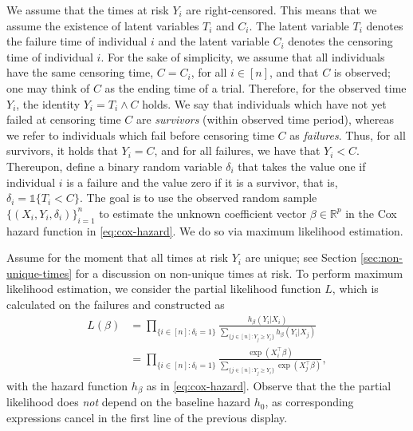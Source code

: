 \documentclass[11pt]{article}
\newcommand{\R}{\mathbb{R}}
\newcommand{\indic}{\mathds{1}}
\begin{document}
We assume that the times at risk $Y_i$ are right-censored. This means that we assume the existence of latent variables $T_i$ and $C_i$. The latent variable $T_i$ denotes the failure time of individual $i$ and the latent variable $C_i$ denotes the censoring time of individual $i$. For the sake of simplicity, we assume that all individuals have the same  censoring time, $C=C_i$, for all $i\in[n]$, and that $C$ is observed; one may think of $C$ as the ending time of a trial. Therefore, for the observed time $Y_i$, the identity $Y_i = T_i \wedge C$ holds. We say that individuals which have not yet failed at censoring time $C$ are  \textit{survivors} (within observed time period), whereas we refer to individuals which fail before censoring time $C$ as \textit{failures}. Thus, for all survivors, it holds that $Y_i = C$, and for all failures, we have that $Y_i < C$. Thereupon, define a binary random variable $\delta_i$ that takes the value one if individual $i$ is a failure and the value zero if it is a survivor, that is, $\delta_i = \indic\{ T_i < C\}$. The goal is to use the observed random sample $\big\{ (X_i, Y_i, \delta_i) \big\}_{i=1}^n$ to estimate the unknown coefficient vector $\beta\in\R^p$ in the Cox hazard function in \eqref{eq:cox-hazard}. We do so via maximum likelihood estimation. 

Assume for the moment that all times at risk $Y_i$ are unique; see Section \ref{sec:non-unique-times} for a discussion on non-unique times at risk. To perform maximum likelihood estimation, we consider the partial likelihood function $L$, which is calculated on the failures and constructed as
\begin{equation} \label{eq:cox-likelihood}
    \begin{split}
        L(\beta)
        &=
        \prod_{\{ i \in [n] : \delta_i = 1 \}}
        \frac{ h_\beta(Y_i | X_i) }{ \sum_{\{ j\in[n] : Y_j \geq Y_i \}} h_\beta(Y_i | X_j) }
        \\
        &=
        \prod_{\{ i \in [n] : \delta_i = 1 \}}
        \frac{ \exp(X_i^\top \beta) }{ \sum_{\{ j\in[n] : Y_j \geq Y_i \}} \exp(X_j^\top \beta) },
    \end{split}
\end{equation}
with the hazard function $h_\beta$ as in \eqref{eq:cox-hazard}. Observe that the the partial likelihood does \textit{not} depend on the baseline hazard $h_0$, as corresponding expressions cancel in the first line of the previous display. 
\end{document}
